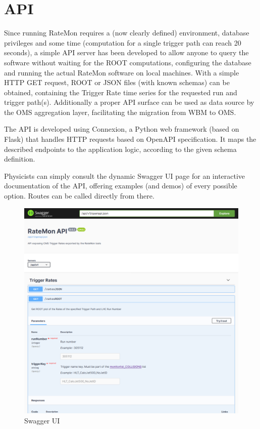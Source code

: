 \section{API}

Since running RateMon requires a (now clearly defined) environment, database privileges and some time (computation for a single trigger path can reach 20 seconds), a simple API \cite{ExposefunctionalitieswithaRestfulAPI8MergeRequestsCMSTSGFOGratemonGitLab-2020-10-07} server has been developed to allow anyone to query the software without waiting for the ROOT computations, configuring the database and running the actual RateMon software on local machines. With a simple HTTP GET request, ROOT or JSON files (with known schemas) can be obtained, containing the Trigger Rate time series for the requested run and trigger path(s). Additionally a proper API surface can be used as data source by the OMS aggregation layer, facilitating the migration from WBM to OMS.

The API is developed using Connexion\cite{zalandoconnexionSwaggerOpenAPIFirstframeworkforPythonontopofFlaskwithautomaticendpointvalidationOAuth2support-2020-10-16}, a Python web framework (based on Flask) that handles HTTP requests based on OpenAPI specification. It maps the described endpoints to the application logic, according to the given schema definition.

Physicists can simply consult the dynamic Swagger UI page for an interactive documentation of the API, offering examples (and demos) of every possible option. Routes can be called directly from there.

\begin{figure}
    \centerline{
        \includegraphics[width=0.8\paperwidth]{figures/swagger-ui}}
    \caption{Swagger UI}
    \label{fig:swagger-ui}
\end{figure}

